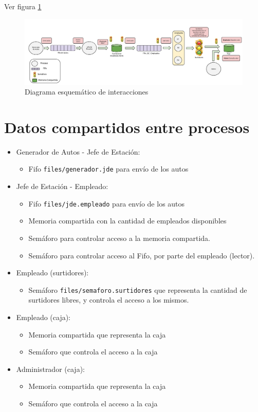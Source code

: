 \documentclass[12pt,a4paper,spanish]{article}
\begin{document}
	Ver figura \ref{diagrama}

\begin{figure}
\label{diagrama}
\includegraphics[angle=90, scale = 0.34]{esquema.png}
\centering
\caption{Diagrama esquemático de interacciones}
\end{figure}

	\section{Datos compartidos entre procesos}
	
	\begin{itemize}
	
	\item Generador de Autos - Jefe de Estación:
		\begin{itemize}
			\item Fifo \texttt{files/generador.jde} para envío de los autos
		\end{itemize}
	
	\item Jefe de Estación - Empleado:
	\begin{itemize}
		\item Fifo \texttt{files/jde.empleado} para envío de los autos
		\item Memoria compartida con la cantidad de empleados disponibles
		\item Semáforo para controlar acceso a la memoria compartida.
		\item Semáforo para controlar acceso al Fifo, por parte del empleado (lector).
	\end{itemize}

	\item Empleado (surtidores):
	\begin{itemize}
		\item Semáforo \texttt{files/semaforo.surtidores} que representa la 
		cantidad de surtidores libres, y controla el acceso a los mismos.
	\end{itemize}

	\item Empleado (caja):
	\begin{itemize}
		\item Memoria compartida que representa la caja
		\item Semáforo que controla el acceso a la caja
	\end{itemize}

	\item Administrador (caja):
	\begin{itemize}
		\item Memoria compartida que representa la caja
		\item Semáforo que controla el acceso a la caja
	\end{itemize}

	\end{itemize}
	\newpage
\end{document}
